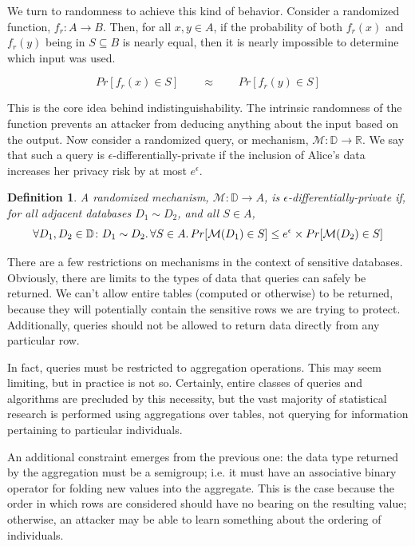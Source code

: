 \documentclass[12pt]{report}
\newtheorem{defn}{Definition}[chapter]
\begin{document}
We turn to randomness to achieve this kind of behavior.
Consider a randomized function, $f_r : A \rightarrow B$.
Then, for all $x,y \in A$, if the probability of both $f_r(x)$ and $f_r(y)$ being in $S \subseteq B$ is nearly equal, then it is nearly impossible to determine which input was used.

$$ Pr[f_r(x)\in S] \qquad\approx\qquad  Pr[f_r(y)\in S] $$

This is the core idea behind indistinguishability.
The intrinsic randomness of the function prevents an attacker from deducing anything about the input based on the output.
Now consider a randomized query, or mechanism, $\mathcal M : \mathbb D \rightarrow \mathbb R$.
We say that such a query is $\epsilon$-differentially-private if the inclusion of Alice's data increases her privacy risk by at most $e^\epsilon$.

\begin{defn}\label{def:diffpriv}
  A randomized mechanism, $\mathcal{M} : \mathbb D \rightarrow A$, is $\epsilon$-differentially-private if, for all adjacent databases $D_1 \sim D_2$, and all $S \in A$,
  $$\forall D_1, D_2 \in \mathbb D \colon D_1\sim D_2\ldotp\forall S\in A\ldotp Pr[\mathcal M(D_1)\in S] \le e^\epsilon \times Pr[\mathcal M(D_2)\in S]$$
\end{defn}

There are a few restrictions on mechanisms in the context of sensitive databases.
Obviously, there are limits to the types of data that queries can safely be returned.
We can't allow entire tables (computed or otherwise) to be returned, because they will potentially contain the sensitive rows we are trying to protect.
Additionally, queries should not be allowed to return data directly from any particular row.

In fact, queries must be restricted to aggregation operations.
This may seem limiting, but in practice is not so.
Certainly, entire classes of queries and algorithms are precluded by this necessity, but the vast majority of statistical research is performed using aggregations over tables, not querying for information pertaining to particular individuals.

An additional constraint emerges from the previous one: the data type returned by the aggregation must be a semigroup; i.e. it must have an associative binary operator for folding new values into the aggregate.
This is the case because the order in which rows are considered should have no bearing on the resulting value; otherwise, an attacker may be able to learn something about the ordering of individuals.
\end{document}
